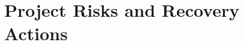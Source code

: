 \documentclass[../../projectPlan.tex]{subfiles}
\begin{document}
	\chapter{Project Risks and Recovery Actions}		

		
\end{document}
